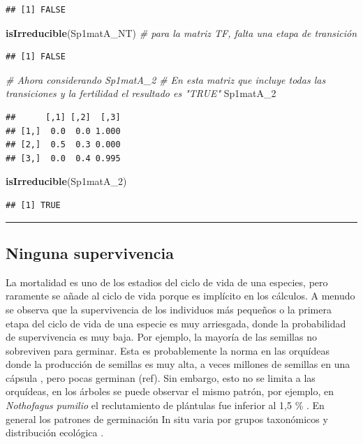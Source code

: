 \documentclass[
]{book}
\newenvironment{Shaded}{\begin{snugshade}}{\end{snugshade}}
\newcommand{\CommentTok}[1]{\textcolor[rgb]{0.56,0.35,0.01}{\textit{#1}}}
\newcommand{\FunctionTok}[1]{\textcolor[rgb]{0.13,0.29,0.53}{\textbf{#1}}}
\newcommand{\NormalTok}[1]{#1}
\theoremstyle{definition}
\theoremstyle{definition}
\theoremstyle{definition}
\theoremstyle{definition}
\theoremstyle{remark}
\begin{document}
\begin{verbatim}
## [1] FALSE
\end{verbatim}

\begin{Shaded}
\begin{Highlighting}[]
\FunctionTok{isIrreducible}\NormalTok{(Sp1matA\_NT) }\CommentTok{\# para la matriz TF, falta una etapa de transición}
\end{Highlighting}
\end{Shaded}

\begin{verbatim}
## [1] FALSE
\end{verbatim}

\begin{Shaded}
\begin{Highlighting}[]
\CommentTok{\# Ahora considerando Sp1matA\_2}
\CommentTok{\# En esta matriz que incluye todas las transiciones y la fertilidad el resultado es "TRUE"}
\NormalTok{Sp1matA\_2}
\end{Highlighting}
\end{Shaded}

\begin{verbatim}
##      [,1] [,2]  [,3]
## [1,]  0.0  0.0 1.000
## [2,]  0.5  0.3 0.000
## [3,]  0.0  0.4 0.995
\end{verbatim}

\begin{Shaded}
\begin{Highlighting}[]
\FunctionTok{isIrreducible}\NormalTok{(Sp1matA\_2) }
\end{Highlighting}
\end{Shaded}

\begin{verbatim}
## [1] TRUE
\end{verbatim}

\begin{center}\rule{0.5\linewidth}{0.5pt}\end{center}

\subsection{Ninguna supervivencia}\label{ninguna-supervivencia}

La mortalidad es uno de los estadios del ciclo de vida de una especies, pero raramente se añade al ciclo de vida porque es implícito en los cálculos. A menudo se observa que la supervivencia de los individuos más pequeños o la primera etapa del ciclo de vida de una especie es muy arriesgada, donde la probabilidad de supervivencia es muy baja. Por ejemplo, la mayoría de las semillas no sobreviven para germinar. Esta es probablemente la norma en las orquídeas donde la producción de semillas es muy alta, a veces millones de semillas en una cápsula \citep{arditti2000numerical}, pero pocas germinan (ref). Sin embargo, esto no se limita a las orquídeas, en los árboles se puede observar el mismo patrón, por ejemplo, en \emph{Nothofagus pumilio} el reclutamiento de plántulas fue inferior al 1,5 \% \citep{torres2015seed}. En general los patrones de germinación In situ varia por grupos taxonómicos y distribución ecológica \citep{iralu2019ecology} .
\end{document}
